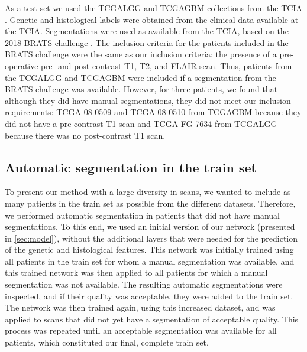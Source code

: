 As a test set we used the \gls{TCGALGG} and \gls{TCGAGBM} collections from the \gls{TCIA} \autocite{pedano2016radiology, scarpace2016radiology}.
Genetic and histological labels were obtained from the clinical data available at the \gls{TCIA}.
Segmentations were used as available from the \gls{TCIA}, based on the 2018 \gls{BRATS} challenge \autocite{bakas2017brats, bakas2017segmentationLGG, bakas2017segmentationHGG}.
The inclusion criteria for the patients included in the \gls{BRATS} challenge were the same as our inclusion criteria: the presence of a pre-operative pre- and post-contrast \gls{T1}, \gls{T2}, and \gls{FLAIR} scan.
Thus, patients from the \gls{TCGALGG} and \gls{TCGAGBM} were included  if a segmentation from the \gls{BRATS} challenge was available.
However, for three patients, we found that although they did have manual segmentations, they did not meet our inclusion requirements: TCGA-08-0509 and TCGA-08-0510 from \gls{TCGAGBM} because they did not have a pre-contrast \gls{T1} scan and TCGA-FG-7634 from \gls{TCGALGG} because there was no post-contrast \gls{T1} scan.

\subsection{Automatic segmentation in the train set}

To present our method with a large diversity in scans, we wanted to include as many patients in the train set as possible from the different datasets.
Therefore, we performed automatic segmentation in patients that did not have manual segmentations.
To this end, we used an initial version of our network (presented in \cref{sec:model}), without the additional layers that were needed for the prediction of the genetic and histological features.
This network was initially trained using all patients in the train set for whom a manual segmentation was available, and this trained network was then applied to all patients for which a manual segmentation was not available.
The resulting automatic segmentations were inspected, and if their quality was acceptable, they were added to the train set.
The network was then trained again, using this increased dataset, and was applied to scans that did not yet have a segmentation of acceptable quality.
This process was repeated until an acceptable segmentation was available for all patients, which constituted our final, complete train set.

